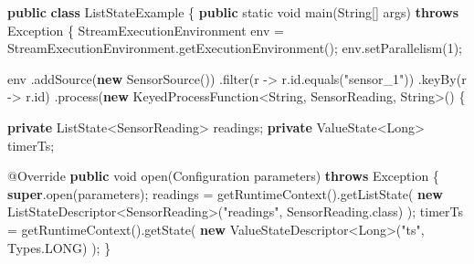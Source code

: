 \documentclass[cn,11pt,chinese]{elegantbook}
\newenvironment{Shaded}{}{}
\newcommand{\AttributeTok}[1]{\textcolor[rgb]{0.49,0.56,0.16}{#1}}
\newcommand{\BuiltInTok}[1]{#1}
\newcommand{\DataTypeTok}[1]{\textcolor[rgb]{0.56,0.13,0.00}{#1}}
\newcommand{\DecValTok}[1]{\textcolor[rgb]{0.25,0.63,0.44}{#1}}
\newcommand{\FunctionTok}[1]{\textcolor[rgb]{0.02,0.16,0.49}{#1}}
\newcommand{\KeywordTok}[1]{\textcolor[rgb]{0.00,0.44,0.13}{\textbf{#1}}}
\newcommand{\NormalTok}[1]{#1}
\newcommand{\StringTok}[1]{\textcolor[rgb]{0.25,0.44,0.63}{#1}}
\begin{document}
\begin{Shaded}
\begin{Highlighting}[]
\KeywordTok{public} \KeywordTok{class}\NormalTok{ ListStateExample \{}
    \KeywordTok{public} \DataTypeTok{static} \DataTypeTok{void} \FunctionTok{main}\NormalTok{(}\BuiltInTok{String}\NormalTok{[] args) }\KeywordTok{throws} \BuiltInTok{Exception}\NormalTok{ \{}
\NormalTok{        StreamExecutionEnvironment env = StreamExecutionEnvironment.}\FunctionTok{getExecutionEnvironment}\NormalTok{();}
\NormalTok{        env.}\FunctionTok{setParallelism}\NormalTok{(}\DecValTok{1}\NormalTok{);}

\NormalTok{        env}
\NormalTok{            .}\FunctionTok{addSource}\NormalTok{(}\KeywordTok{new} \FunctionTok{SensorSource}\NormalTok{())}
\NormalTok{            .}\FunctionTok{filter}\NormalTok{(r {-}\textgreater{} r.}\FunctionTok{id}\NormalTok{.}\FunctionTok{equals}\NormalTok{(}\StringTok{"sensor\_1"}\NormalTok{))}
\NormalTok{            .}\FunctionTok{keyBy}\NormalTok{(r {-}\textgreater{} r.}\FunctionTok{id}\NormalTok{)}
\NormalTok{            .}\FunctionTok{process}\NormalTok{(}\KeywordTok{new}\NormalTok{ KeyedProcessFunction\textless{}}\BuiltInTok{String}\NormalTok{, SensorReading, }\BuiltInTok{String}\NormalTok{\textgreater{}() \{}

                \KeywordTok{private}\NormalTok{ ListState\textless{}SensorReading\textgreater{} readings;}
                \KeywordTok{private}\NormalTok{ ValueState\textless{}}\BuiltInTok{Long}\NormalTok{\textgreater{} timerTs;}

                \AttributeTok{@Override}
                \KeywordTok{public} \DataTypeTok{void} \FunctionTok{open}\NormalTok{(}\BuiltInTok{Configuration}\NormalTok{ parameters) }\KeywordTok{throws} \BuiltInTok{Exception}\NormalTok{ \{}
                    \KeywordTok{super}\NormalTok{.}\FunctionTok{open}\NormalTok{(parameters);}
\NormalTok{                    readings = }\FunctionTok{getRuntimeContext}\NormalTok{().}\FunctionTok{getListState}\NormalTok{(}
                            \KeywordTok{new}\NormalTok{ ListStateDescriptor\textless{}SensorReading\textgreater{}(}\StringTok{"readings"}\NormalTok{, SensorReading.}\FunctionTok{class}\NormalTok{)}
\NormalTok{                    );}
\NormalTok{                    timerTs = }\FunctionTok{getRuntimeContext}\NormalTok{().}\FunctionTok{getState}\NormalTok{(}
                            \KeywordTok{new}\NormalTok{ ValueStateDescriptor\textless{}}\BuiltInTok{Long}\NormalTok{\textgreater{}(}\StringTok{"ts"}\NormalTok{, }\BuiltInTok{Types}\NormalTok{.}\FunctionTok{LONG}\NormalTok{)}
\NormalTok{                    );}
\NormalTok{                \}}


\end{Highlighting}
\end{Shaded}
\end{document}
